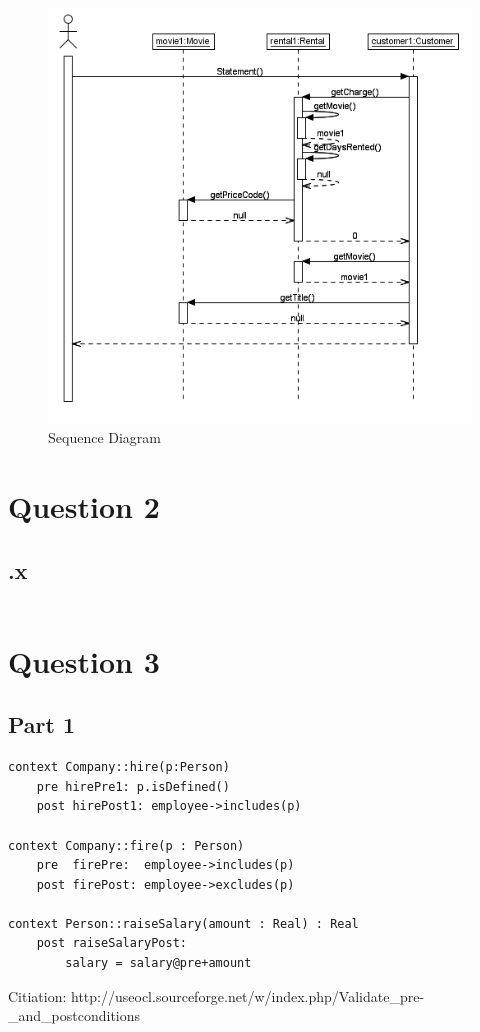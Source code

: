 \documentclass{article}
\begin{document}
\begin{figure}
	\includegraphics[width=\linewidth]{Q1Sequence.PNG}
	\caption{Sequence Diagram}
	\label{fig:seq}
\end{figure}
\section*{Question 2}
\subsection*{.x}
\begin{Verbatim}

\end{Verbatim}
\section{Question 3}
\subsection*{Part 1}
\begin{Verbatim}
context Company::hire(p:Person)
	pre hirePre1: p.isDefined()
	post hirePost1: employee->includes(p)

context Company::fire(p : Person)
	pre  firePre:  employee->includes(p)
	post firePost: employee->excludes(p)

context Person::raiseSalary(amount : Real) : Real
	post raiseSalaryPost:
		salary = salary@pre+amount
\end{Verbatim}
Citiation: http://useocl.sourceforge.net/w/index.php/Validate\_pre-\_and\_postconditions
\end{document}
